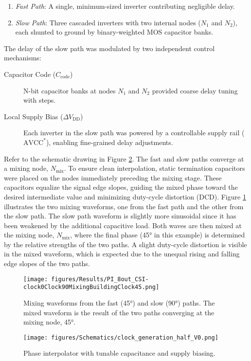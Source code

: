 \begin{enumerate}
  \item \emph{Fast Path}: A single, minimum-sized inverter contributing negligible delay.
  \item \emph{Slow Path}: Three cascaded inverters with two internal nodes ($N_1$ and $N_2$), each shunted to ground by binary-weighted MOS capacitor banks.
\end{enumerate}

The delay of the slow path was modulated by two independent control mechanisms:
\begin{description}
  \item[Capacitor Code ($C_\text{code}$)] N-bit capacitor banks at nodes $N_1$ and $N_2$ provided coarse delay tuning with steps.
  \item[Local Supply Bias ($\Delta V_\text{DD}$)] Each inverter in the slow path was powered by a controllable supply rail ($\text{AVCC}^*$), enabling fine-grained delay adjustments.
\end{description}

Refer to the schematic drawing in Figure \ref{fig:PI_1_schematic}. The fast and slow paths converge at a mixing node, $N_\text{mix}$. To ensure clean interpolation, static termination capacitors were placed on the nodes immediately preceding the mixing stage. These capacitors equalize the signal edge slopes, guiding the mixed phase toward the desired intermediate value and minimizing duty-cycle distortion (DCD).
Figure \ref{fig:PI_1_mixing_waveforms} illustrates the two mixing waveforms, one from the fast path and the other from the slow path. The slow path waveform is slightly more sinusoidal since it has been weakened by the additional capacitive load. Both waves are then mixed at the mixing node, $N_\text{mix}$, where the final phase (\ang{45} in this example) is determined by the relative strengths of the two paths. A slight duty-cycle distortion is visible in the mixed waveform, which is expected due to the unequal rising and falling edge slopes of the two paths. 
\begin{figure}
  \centering
  \texttt{[image: figures/Results/PI\_8out\_CSI-clock0Clock90MixingBuildingClock45.png]}
  \caption{Mixing waveforms from the fast (\ang{45}) and slow (\ang{90}) paths. The mixed waveform is the result of the two paths converging at the mixing node, \ang{45}.}
  \label{fig:PI_1_mixing_waveforms}
\end{figure}
\begin{figure}[H]
  \centering
  \texttt{[image: figures/Schematics/clock\_generation\_half\_V0.png]}
  \caption{Phase interpolator with tunable capacitance and supply biasing.}
  \label{fig:PI_1_schematic}
\end{figure}

